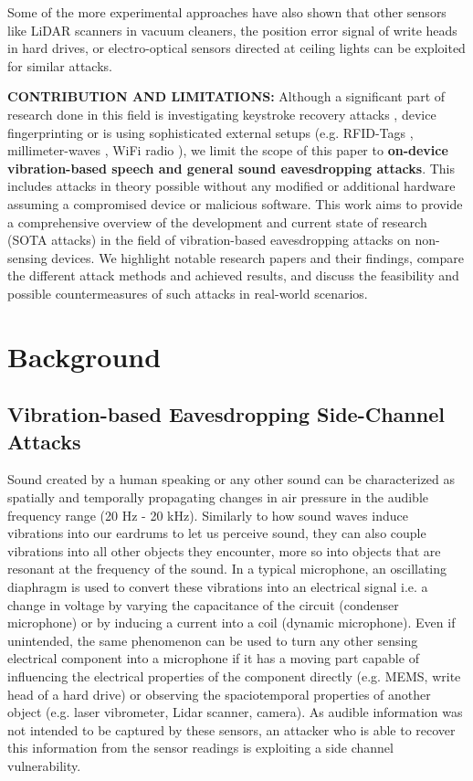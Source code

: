 \documentclass[sigconf, nonacm]{acmart}
\begin{document}
Some of the more experimental approaches have also shown that other sensors like LiDAR scanners in vacuum cleaners, the position error signal of write heads in hard drives, or electro-optical sensors directed at ceiling lights can be exploited for similar attacks.
\\
\begin{sloppypar}
  \noindent
  \textbf{CONTRIBUTION AND LIMITATIONS:} Although a significant part of research done in this field is investigating keystroke recovery attacks \cite{Touchtone2023}\cite{TouchLogger2011}\cite{TapLogger2012}, device fingerprinting \cite{AccelerometerFingerprinting2016}\cite{MEMSFingerprinting2013} or is using sophisticated external setups (e.g. RFID-Tags \cite{RFMic2023}, millimeter-waves \cite{MMMic2022}, WiFi radio \cite{ART2015}), we limit the scope of this paper to \textbf{on-device vibration-based speech and general sound eavesdropping attacks}.
  This includes attacks in theory possible without any modified or additional hardware assuming a compromised device or malicious software.
  This work aims to provide a comprehensive overview of the development and current state of research (SOTA attacks) in the field of vibration-based eavesdropping attacks on non-sensing devices.
  We highlight notable research papers and their findings, compare the different attack methods and achieved results, and discuss the feasibility and possible countermeasures of such attacks in real-world scenarios.
\end{sloppypar}

\section{Background}
\subsection{Vibration-based Eavesdropping Side-Channel Attacks}
Sound created by a human speaking or any other sound can be characterized as spatially and temporally propagating changes in air pressure in the audible frequency range (20 Hz - 20 kHz).
Similarly to how sound waves induce vibrations into our eardrums to let us perceive sound, they can also couple vibrations into all other objects they encounter, more so into objects that are resonant at the frequency of the sound.
In a typical microphone, an oscillating diaphragm is used to convert these vibrations into an electrical signal i.e. a change in voltage by varying the capacitance of the circuit (condenser microphone) or by inducing a current into a coil (dynamic microphone).
Even if unintended, the same phenomenon can be used to turn any other sensing electrical component into a microphone if it has a moving part capable of influencing the electrical properties of the component directly (e.g. MEMS, write head of a hard drive) or observing the spaciotemporal properties of another object (e.g. laser vibrometer, Lidar scanner, camera).
As audible information was not intended to be captured by these sensors, an attacker who is able to recover this information from the sensor readings is exploiting a side channel vulnerability.
\end{document}
